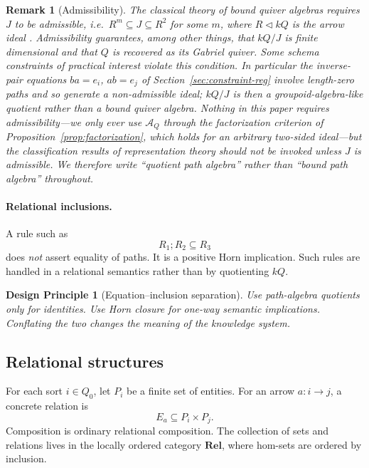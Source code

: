 \documentclass[11pt]{article}
\newtheorem{remark}[definition]{Remark}
\newtheorem{principle}[definition]{Design Principle}
\newcommand{\Rel}{\mathbf{Rel}}
\newcommand{\A}{\mathcal{A}}
\begin{document}
\begin{remark}[Admissibility]
\label{rem:admissible}
The classical theory of \emph{bound quiver algebras} requires $J$ to be admissible, i.e.\ $R^m\subseteq J\subseteq R^2$ for some $m$, where $R\triangleleft kQ$ is the arrow ideal \citep{derksen2017,schiffler2014}. Admissibility guarantees, among other things, that $kQ/J$ is finite dimensional and that $Q$ is recovered as its Gabriel quiver. Some schema constraints of practical interest violate this condition. In particular the inverse-pair equations $ba=e_i$, $ab=e_j$ of Section~\ref{sec:constraint-reg} involve length-zero paths and so generate a non-admissible ideal; $kQ/J$ is then a groupoid-algebra-like quotient rather than a bound quiver algebra. Nothing in this paper requires admissibility---we only ever use $\A_Q$ through the factorization criterion of Proposition~\ref{prop:factorization}, which holds for an arbitrary two-sided ideal---but the classification results of representation theory should not be invoked unless $J$ is admissible. We therefore write ``quotient path algebra'' rather than ``bound path algebra'' throughout.
\end{remark}

\paragraph{Relational inclusions.} A rule such as
\[
R_1;R_2\subseteq R_3
\]
does \emph{not} assert equality of paths. It is a positive Horn implication. Such rules are handled in a relational semantics rather than by quotienting $kQ$.

\begin{principle}[Equation--inclusion separation]
\label{prin:eq-incl}
Use path-algebra quotients only for identities. Use Horn closure for one-way semantic implications. Conflating the two changes the meaning of the knowledge system.
\end{principle}

\subsection{Relational structures}
For each sort $i\in Q_0$, let $P_i$ be a finite set of entities. For an arrow $a:i\to j$, a concrete relation is
\[
E_a\subseteq P_i\times P_j.
\]
Composition is ordinary relational composition. The collection of sets and relations lives in the locally ordered category $\Rel$, where hom-sets are ordered by inclusion.
\end{document}
